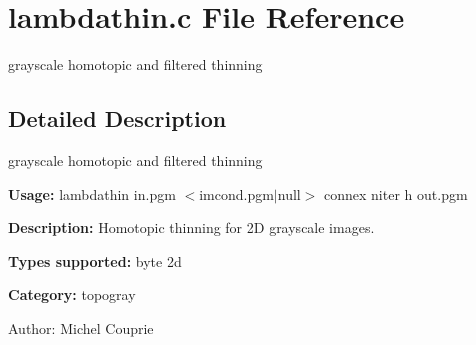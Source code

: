 \section{lambdathin.c File Reference}
\label{lambdathin_8c}
grayscale homotopic and filtered thinning  




\label{_details}
\subsection{Detailed Description}
grayscale homotopic and filtered thinning 

{\bf Usage:} lambdathin in.pgm $<$imcond.pgm$|$null$>$ connex niter h out.pgm

{\bf Description:} Homotopic thinning for 2D grayscale images.

{\bf Types supported:} byte 2d

{\bf Category:} topogray

\begin{Desc}
\item[Author:]Michel Couprie \end{Desc}
